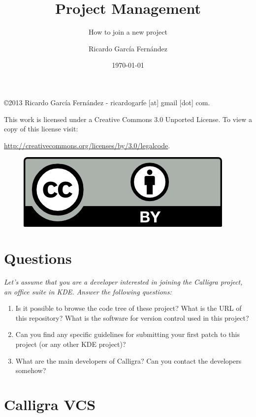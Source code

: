 \documentclass[11pt]{scrartcl}
\title{\textbf{Project Management}}
\subtitle{How to join a new project}
\author{Ricardo Garc\'ia Fern\'andez}
\date{\today}
\begin{document}
\maketitle

\vfill

\begin{flushright}
    \copyright  2013 Ricardo Garc\'ia Fern\'andez - ricardogarfe [at] gmail [dot] com.

    This work is licensed under a Creative Commons 3.0 Unported License.
    To view a copy of this license visit:
 
    \url{http://creativecommons.org/licenses/by/3.0/legalcode}.
\end{flushright}

\begin{figure}[h]
    \begin{flushright}	
        \includegraphics{by}
        \label{fig:by}
    \end{flushright}
\end{figure}

\newpage

\section{Questions}

\emph{Let's assume that you are a developer interested in joining the Calligra project, an office suite in KDE. Answer the following questions:}

\begin{enumerate}
	\item Is it possible to browse the code tree of these project? What is the URL of this repository? What is the software for version control used in this project?
	\item Can you find any specific guidelines for submitting your first patch to this project (or any other KDE project)?
	\item What are the main developers of Calligra? Can you contact the developers somehow?
\end{enumerate}

\section{Calligra VCS}
\label{sec:q-01}
\end{document}
